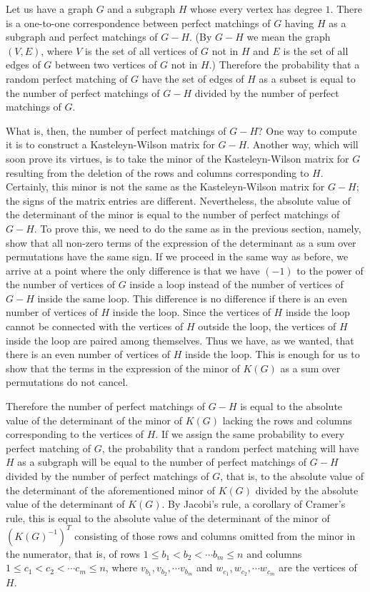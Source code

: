\documentclass[10pt,reqno]{amsart}
\theoremstyle{plain}
\theoremstyle{definition}
\theoremstyle{remark}
\begin{document}
Let us have a graph $G$ and a subgraph $H$ whose every vertex has degree $1$.
There is a one-to-one correspondence 
between perfect matchings of $G$ having $H$ as a subgraph and perfect matchings
of $G-H$. (By $G-H$ we mean the graph $(V,E)$, where $V$ is the
set of all vertices of $G$ not in $H$ and $E$ is
the set of all edges of $G$ between two vertices of $G$ not in $H$.)
Therefore the probability that a random perfect matching of $G$ have the
set of edges of $H$ as a subset is equal to the number of perfect matchings
 of $G-H$ divided by the number of perfect matchings of $G$. 

What is, then, the number of perfect matchings of $G-H$? One way to compute it
is to construct a Kasteleyn-Wilson matrix for $G-H$. Another way,
which will soon prove its virtues, is to take the minor of the
Kasteleyn-Wilson matrix for $G$ resulting from the deletion of the rows
and columns corresponding to $H$. Certainly, this minor is not the same
as the Kasteleyn-Wilson matrix for $G-H$; the signs of the matrix entries are
different. Nevertheless, the absolute value
of the determinant of the minor 
is equal to the number of perfect matchings of $G-H$. To prove
this, we need to do the same as in the previous section, namely, show that
all non-zero terms of the expression of the determinant as a
sum over permutations have the same sign.
If we proceed in the same way as before,
we  arrive at a point where the only difference is that
we have $(-1)$ to the power of the number of vertices of $G$ inside a loop
instead of the number of vertices of $G-H$ inside the same loop.
This difference is no difference if there is an even number of vertices
of $H$ inside the loop. Since the vertices of $H$ 
inside the loop cannot be connected with the vertices of $H$ outside 
the loop, the vertices of $H$ inside the loop are paired among themselves.
Thus we have, as we wanted, that
there is an even number of vertices of $H$ inside the loop.  
This is enough for us to show that 
the terms in the expression of the minor of $K(G)$ as a sum over
permutations do not cancel.

Therefore the number of perfect matchings of $G-H$ is equal to the
absolute value of the determinant of the minor of $K(G)$ lacking
the rows and columns corresponding to the vertices of $H$. If we
assign the same probability to every perfect matching of $G$, the probability
that a random perfect matching will have $H$ as a subgraph will be equal to
the number of perfect matchings of $G-H$ divided by the number of
perfect matchings of $G$, that is, to the absolute value of the
determinant of the aforementioned minor of $K(G)$ divided by
the absolute value of the determinant of $K(G)$. By Jacobi's rule,
a corollary of Cramer's rule, this is equal to the absolute value of the
determinant of the minor of $(K(G)^{-1})^T$ consisting of those rows
and columns omitted from the minor in the numerator, that is, of
rows
$1\leq b_1<b_2<\dotsb b_m\leq n$ and columns
$1\leq c_1<c_2<\dotsb c_m\leq n$, where $v_{b_1},v_{b_2},\dotsb v_{b_m}$
and $w_{c_1},w_{c_2},\dotsb w_{c_m}$ are the vertices of $H$.
\end{document}
